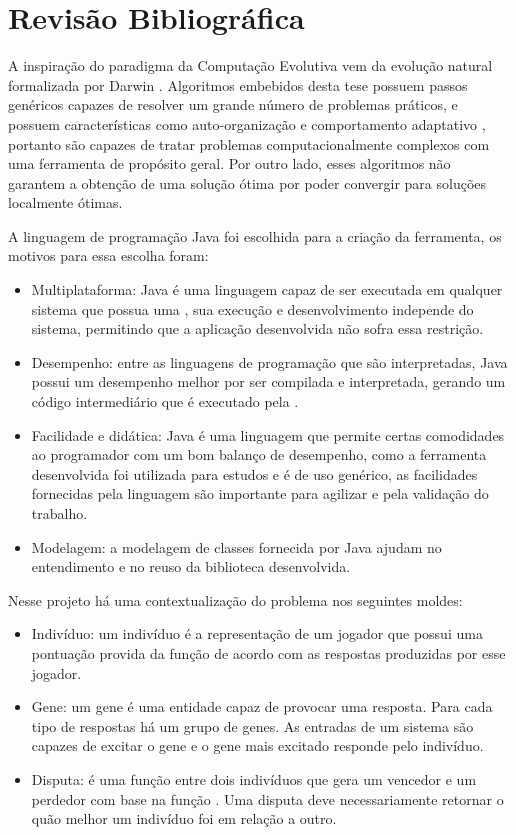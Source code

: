 \section{Revisão Bibliográfica} \label{secao:rev_bib}

A inspiração do paradigma da Computação Evolutiva vem da evolução natural formalizada por Darwin \cite{Ridley1996}. Algoritmos embebidos desta tese possuem passos genéricos capazes de resolver um grande número de problemas práticos, e possuem características como auto-organização e comportamento adaptativo \cite{Goldberg1988}, portanto são capazes de tratar problemas computacionalmente complexos com uma ferramenta de propósito geral. Por outro lado, esses algoritmos não garantem a obtenção de uma solução ótima \cite{Zuben2000} por poder convergir para soluções localmente ótimas.

A linguagem de programação Java foi escolhida para a criação da ferramenta, os motivos para essa escolha foram:

\newcommand{\JVM}{\sigla{JVM}{Java Virtual Machine}\xspace}

\begin{itemize}
    \item Multiplataforma: Java é uma linguagem capaz de ser executada em qualquer sistema que possua uma \JVM, sua execução e desenvolvimento independe do sistema, permitindo que a aplicação desenvolvida não sofra essa restrição.
    \item Desempenho: entre as linguagens de programação que são interpretadas, Java possui um desempenho melhor por ser compilada e interpretada, gerando um código intermediário que é executado pela \JVM.
    \item Facilidade e didática: Java é uma linguagem que permite certas comodidades ao programador com um bom balanço de desempenho, como a ferramenta desenvolvida foi utilizada para estudos e é de uso genérico, as facilidades fornecidas pela linguagem são importante para agilizar e pela validação do trabalho.
    \item Modelagem: a modelagem de classes fornecida por Java ajudam no entendimento e no reuso da biblioteca desenvolvida.
\end{itemize}

Nesse projeto há uma contextualização do problema nos seguintes moldes:

\begin{itemize}
    \item Indivíduo: um indivíduo é a representação de um jogador que possui uma pontuação provida da função \fitness de acordo com as respostas produzidas por esse jogador.
    \item Gene: um gene é uma entidade capaz de provocar uma resposta. Para cada tipo de respostas há um grupo de genes. As entradas de um sistema são capazes de excitar o gene e o gene mais excitado responde pelo indivíduo.
    \item Disputa: é uma função entre dois indivíduos que gera um vencedor e um perdedor com base na função \fitness. Uma disputa deve necessariamente retornar o quão melhor um indivíduo foi em relação a outro.
\end{itemize}

